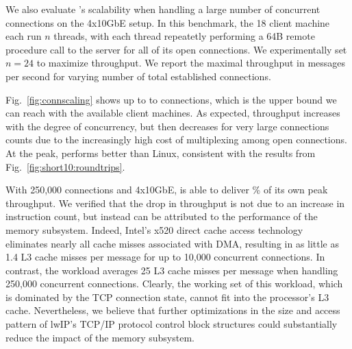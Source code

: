 \label{sec:eval:scale}

We also evaluate \ix's scalability when handling a large number of
concurrent connections on the 4x10GbE setup. In this benchmark, the 18 client machine each run
$n$ threads, with each thread repeatetly performing a 64B remote
procedure call to the server for all of its open connections.
We experimentally set $n=24$ to maximize throughput.  We report
the maximal throughput in messages per second for varying number of
total established connections.



Fig.~\ref{fig:connscaling} shows up to to  connections, which
is the upper bound we can reach with the available client machines.
As expected, throughput increases with the degree of concurrency, but
then decreases for very large connections counts due to the
increasingly high cost of multiplexing among open connections.  At the
peak, \ix performs  better than Linux, consistent with the results
from Fig.~\ref{fig:short10:roundtrips}.  

With 250,000 connections and
4x10GbE, \ix is able to deliver  \% of its own peak throughput.
We verified that the drop in throughput is not due to an increase in
instruction count, but instead can be attributed to the performance of
the memory subsystem. Indeed,
Intel's x520 direct cache access
technology~\cite{DBLP:conf/isca/HuggahalliIT05} eliminates nearly all
cache misses associated with DMA, resulting in as little as 1.4 L3
cache misses per message for up to 10,000 concurrent connections.  In
contrast, the workload averages 25 L3 cache misses per message when
handling 250,000 concurrent connections.  Clearly, the working set of
this workload, which is dominated by the TCP connection state, cannot
fit into the processor's L3 cache.  Nevertheless, we believe that
further optimizations in the size and access pattern of lwIP's TCP/IP
protocol control block structures could substantially reduce the
impact of the memory subsystem.
  



